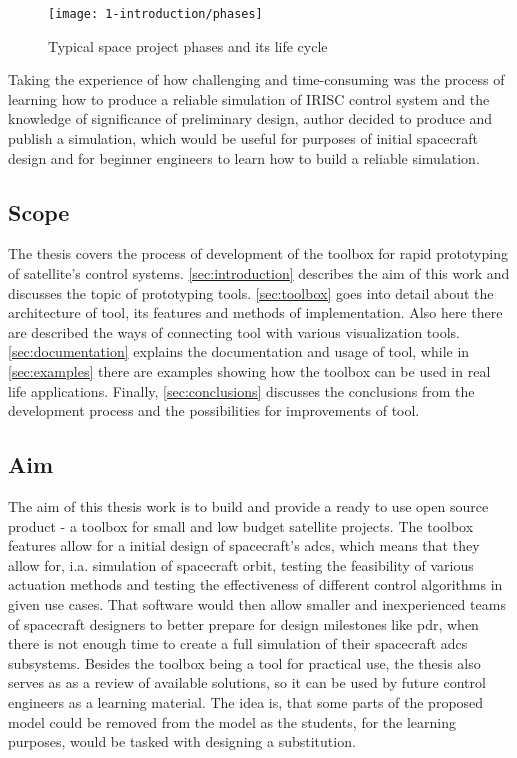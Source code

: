     \begin{figure}[H]
        \centering
        \texttt{[image: 1-introduction/phases]}
        \caption{Typical space project phases and its life cycle\cite{nguyen2000effective}}
        \label{fig:phases}
    \end{figure}

    Taking the experience of how challenging and time-consuming was the process of learning how to produce a reliable simulation of IRISC control system and the knowledge of significance of preliminary design, author decided to produce and publish a simulation, which would be useful for purposes of initial spacecraft design and for beginner engineers to learn how to build a reliable simulation. 
    

\subsection{Scope}
    The thesis covers the process of development of the toolbox for rapid prototyping of satellite's control systems. \autoref{sec:introduction} describes the aim of this work and discusses the topic of prototyping tools. \autoref{sec:toolbox} goes into detail about the architecture of \ac{tool}, its features and methods of implementation. Also here there are described the ways of connecting \ac{tool} with various visualization tools. \autoref{sec:documentation} explains the documentation and usage of \ac{tool}, while in \autoref{sec:examples} there are examples showing how the toolbox can be used in real life applications. Finally, \autoref{sec:conclusions} discusses the conclusions from the development process and the possibilities for improvements of \ac{tool}.

\subsection{Aim}\label{sec:aim}
    The aim of this thesis work is to build and provide a ready to use open source product - a toolbox for small and low budget satellite projects.  The toolbox features allow for a initial design of spacecraft's \ac{adcs}, which means that they allow for, i.a. simulation of spacecraft orbit, testing the feasibility of various actuation methods and testing the effectiveness of different control algorithms in given use cases.  That software would then allow smaller and inexperienced teams of spacecraft designers to better prepare for design milestones like \ac{pdr}, when there is not enough time to create a full simulation of their spacecraft \ac{adcs} subsystems. Besides the toolbox being a tool for practical use, the thesis also serves as as a review of available solutions, so it can be used by future control engineers as a learning material. The idea is, that some parts of the proposed model could be removed from the model as the students, for the learning purposes, would be tasked with designing a substitution.


